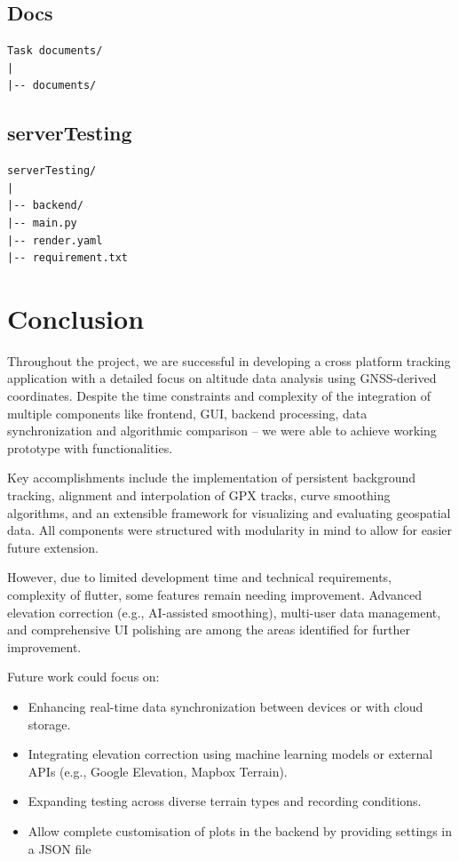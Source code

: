 \documentclass[12pt]{article}
\begin{document}
\subsection*{Docs}
\begin{verbatim}
Task documents/
|
|-- documents/
\end{verbatim}

\subsection*{serverTesting}
\begin{verbatim}
serverTesting/
|
|-- backend/
|-- main.py
|-- render.yaml
|-- requirement.txt

\end{verbatim}

\clearpage
\section{Conclusion}

Throughout the project, we are successful in developing a cross platform tracking application with a detailed focus on altitude data analysis using GNSS-derived coordinates. Despite the time constraints and complexity of the integration of multiple components like frontend, GUI, backend processing, data synchronization and algorithmic comparison -- we were able to achieve working prototype with functionalities. 

Key accomplishments include the implementation of persistent background tracking, alignment and interpolation of GPX tracks, curve smoothing algorithms, and an extensible framework for visualizing and evaluating geospatial data. All components were structured with modularity in mind to allow for easier future extension.

However, due to limited development time and technical requirements, complexity of flutter, some features remain needing improvement. Advanced elevation correction (e.g., AI-assisted smoothing), multi-user data management, and comprehensive UI polishing are among the areas identified for further improvement.

Future work could focus on:
\begin{itemize}
    \item Enhancing real-time data synchronization between devices or with cloud storage.
    \item Integrating elevation correction using machine learning models or external APIs (e.g., Google Elevation, Mapbox Terrain).
    \item Expanding testing across diverse terrain types and recording conditions.
    \item Allow complete customisation of plots in the backend by providing settings in a JSON file

\end{itemize}
\end{document}
